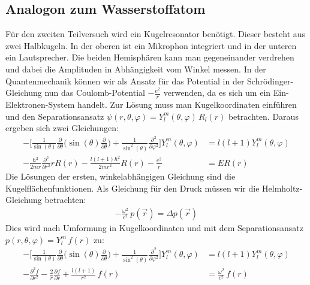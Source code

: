 \documentclass[german,  %
parskip=full,  %
]{scrartcl}
\begin{document}
\subsection{Analogon zum Wasserstoffatom}
Für den zweiten Teilversuch wird ein Kugelresonator benötigt. Dieser besteht aus zwei Halbkugeln. In der oberen ist ein Mikrophon integriert und in der unteren ein Lautsprecher. Die beiden Hemisphären kann man gegeneinander verdrehen und dabei die Amplituden in Abhängigkeit vom Winkel messen.
\newline
\newline In der Quantenmechanik können wir als Ansatz für das Potential in der Schrödinger-Gleichung nun das Coulomb-Potential $-\frac{e^2}{r}$ verwenden, da es sich um ein Ein-Elektronen-System handelt. Zur Lösung muss man Kugelkoordinaten einführen und den Separationsansatz $\psi(r, \theta, \varphi) = Y^{m}_{l}(\theta, \varphi) \, R_{l}(r)$ betrachten. Daraus ergeben sich zwei Gleichungen:
\begin{align}
\label{kugelfl}-\bigg \lbrack \frac{1}{\sin(\theta)} \frac{\partial}{\partial \theta} \bigg(\sin(\theta) \frac{\partial}{\partial \theta} \bigg) + \frac{1}{\sin^2(\theta)} \frac{\partial^2}{\partial \varphi^2} \bigg \rbrack Y^{m}_{l}(\theta, \varphi) &= l(l+1) Y^{m}_{l}(\theta, \varphi) \\
-\frac{\hbar^2}{2mr} \frac{\partial^2}{\partial r^2} r R(r) - \frac{l(l+1)\hbar^2}{2mr^2} R(r)-\frac{e^2}{r} &= ER(r)
\end{align}
Die Lösungen der ersten, winkelabhängigen Gleichung sind die Kugelflächenfunktionen.
\newline
\newline Als Gleichung für den Druck  müssen wir die Helmholtz-Gleichung betrachten:
\begin{align}
-\frac{\omega^2}{c^2} \, p(\vec{r}) = \Delta p(\vec{r})
\end{align}
Dies wird nach Umformung in Kugelkoordinaten und mit dem Separationsansatz $p(r, \theta, \varphi) = Y^{m}_{l} \, f(r)$ zu:
\begin{align}
\label{kugelfl}-\bigg \lbrack \frac{1}{\sin(\theta)} \frac{\partial}{\partial \theta} \bigg(\sin(\theta) \frac{\partial}{\partial \theta} \bigg) + \frac{1}{\sin^2(\theta)} \frac{\partial^2}{\partial \varphi^2} \bigg \rbrack Y^{m}_{l}(\theta, \varphi) &= l(l+1) Y^{m}_{l}(\theta, \varphi) \\
-\frac{\partial^2f}{\partial r^2}-\frac{2}{r}\frac{\partial f}{\partial r}+\frac{l(l+1)}{r^2}\, f(r) &= \frac{\omega^2}{c^2}\, f(r)
\end{align}
\end{document}
